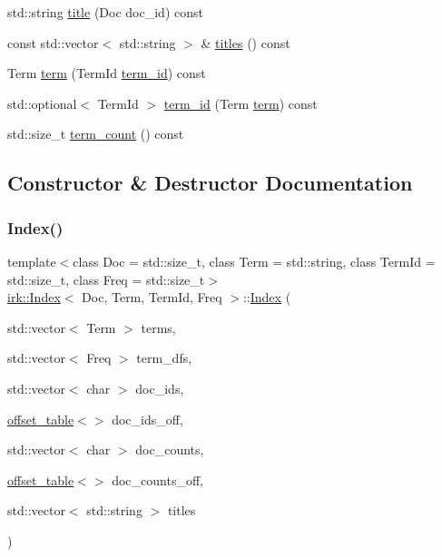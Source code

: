 \begin{DoxyCompactItemize}
\item 
std\+::string \mbox{\hyperlink{classirk_1_1Index_a9cab8400d1213a23ac1d846cd8f3b1ac}{title}} (Doc doc\+\_\+id) const
\item 
const std\+::vector$<$ std\+::string $>$ \& \mbox{\hyperlink{classirk_1_1Index_afb307eea8951d7915c19e411ef31ba65}{titles}} () const
\item 
Term \mbox{\hyperlink{classirk_1_1Index_a359813adc185edff595b8adbd743a21c}{term}} (Term\+Id \mbox{\hyperlink{classirk_1_1Index_adf03f14a502c40a0428ec9cc9f638a68}{term\+\_\+id}}) const
\item 
std\+::optional$<$ Term\+Id $>$ \mbox{\hyperlink{classirk_1_1Index_adf03f14a502c40a0428ec9cc9f638a68}{term\+\_\+id}} (Term \mbox{\hyperlink{classirk_1_1Index_a359813adc185edff595b8adbd743a21c}{term}}) const
\item 
std\+::size\+\_\+t \mbox{\hyperlink{classirk_1_1Index_af44451a0920202002c716e64a5f2fe03}{term\+\_\+count}} () const
\end{DoxyCompactItemize}


\subsection{Constructor \& Destructor Documentation}
\mbox{\label{classirk_1_1Index_a2f39a24037a6bfd1045e1d72ef00efa5}} 
\subsubsection{\texorpdfstring{Index()}{Index()}\hspace{0.1cm}{\footnotesize\ttfamily [1/2]}}
{\footnotesize\ttfamily template$<$class Doc  = std\+::size\+\_\+t, class Term  = std\+::string, class Term\+Id  = std\+::size\+\_\+t, class Freq  = std\+::size\+\_\+t$>$ \\
\mbox{\hyperlink{classirk_1_1Index}{irk\+::\+Index}}$<$ Doc, Term, Term\+Id, Freq $>$\+::\mbox{\hyperlink{classirk_1_1Index}{Index}} (\begin{DoxyParamCaption}\item[{std\+::vector$<$ Term $>$}]{terms,  }\item[{std\+::vector$<$ Freq $>$}]{term\+\_\+dfs,  }\item[{std\+::vector$<$ char $>$}]{doc\+\_\+ids,  }\item[{\mbox{\hyperlink{classirk_1_1offset__table}{offset\+\_\+table}}$<$$>$}]{doc\+\_\+ids\+\_\+off,  }\item[{std\+::vector$<$ char $>$}]{doc\+\_\+counts,  }\item[{\mbox{\hyperlink{classirk_1_1offset__table}{offset\+\_\+table}}$<$$>$}]{doc\+\_\+counts\+\_\+off,  }\item[{std\+::vector$<$ std\+::string $>$}]{titles }\end{DoxyParamCaption})\hspace{0.3cm}{\ttfamily [inline]}}

